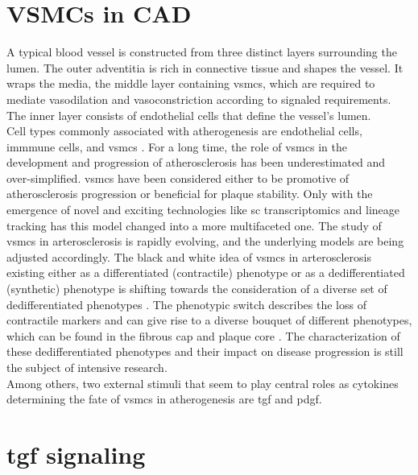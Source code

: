 \section{VSMCs in CAD}
\label{sec:haosms}
A typical blood vessel is constructed from three distinct layers surrounding the lumen. The outer adventitia is rich in connective tissue and shapes the vessel. It wraps the media, the middle layer containing \acp{vsmc}, which are required to mediate vasodilation and vasoconstriction according to signaled requirements. The inner layer consists of endothelial cells that define the vessel's lumen. \cite{tuckerAnatomyBloodVessels2022a, yapSixShadesVascular2021}\\
Cell types commonly associated with atherogenesis are endothelial cells, immmune cells, and \acp{vsmc} \cite{tabasRecentInsightsCellular2015}. For a long time, the role of \acp{vsmc} in the development and progression of atherosclerosis has been underestimated and over-simplified. \acp{vsmc} have been considered either to be promotive of atherosclerosis progression or beneficial for plaque stability. Only with the emergence of novel and exciting technologies like \ac{sc} transcriptomics and lineage tracking has this model changed into a more multifaceted one. \cite{liuSmoothMuscleCell2019, grootaertVascularSmoothMuscle2021, yapSixShadesVascular2021} The study of \acp{vsmc} in arterosclerosis is rapidly evolving, and the underlying models are being adjusted accordingly. The black and white idea of \acp{vsmc} in arterosclerosis existing either as a differentiated (contractile) phenotype or as a dedifferentiated (synthetic) phenotype is shifting towards the consideration of a diverse set of dedifferentiated phenotypes \cite{liuSmoothMuscleCell2019, grootaertVascularSmoothMuscle2021, yapSixShadesVascular2021}. The phenotypic switch describes the loss of contractile markers and can give rise to a diverse bouquet of different phenotypes, which can be found in the fibrous cap and plaque core \cite{grootaertVascularSmoothMuscle2021}. The characterization of these dedifferentiated phenotypes and their impact on disease progression is still the subject of intensive research.\\
Among others, two external stimuli that seem to play central roles as cytokines determining the fate of \acp{vsmc} in atherogenesis are \acf{tgf} and \acf{pdgf}.


\section{\acs{tgf} signaling}
\label{sec:tgf}

